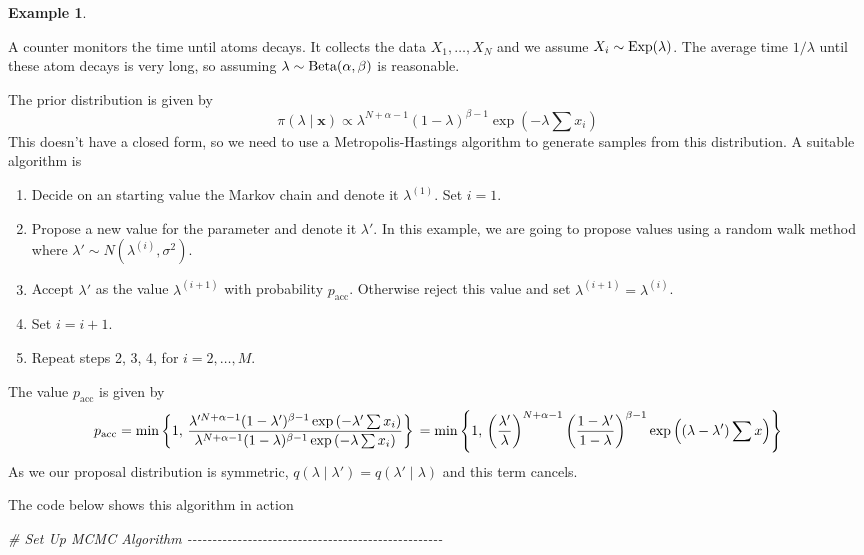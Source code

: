 \documentclass[
]{book}
\newenvironment{Shaded}{\begin{snugshade}}{\end{snugshade}}
\newcommand{\CommentTok}[1]{\textcolor[rgb]{0.56,0.35,0.01}{\textit{#1}}}
\providecommand{\tightlist}{%
  \setlength{\itemsep}{0pt}\setlength{\parskip}{0pt}}
\theoremstyle{definition}
\theoremstyle{definition}
\newtheorem{example}{Example}[chapter]
\theoremstyle{definition}
\theoremstyle{definition}
\theoremstyle{remark}
\begin{document}
\begin{example}
\protect\hypertarget{exm:norm}{}\label{exm:norm}

A counter monitors the time until atoms decays. It collects the data \(X_1, \ldots, X_N\) and we assume \(X_i \sim \hbox{Exp}(\lambda)\). The average time \(1/\lambda\) until these atom decays is very long, so assuming \(\lambda \sim \hbox{Beta}(\alpha, \beta)\) is reasonable.

The prior distribution is given by
\[
\pi(\lambda \mid \boldsymbol{x}) \propto \lambda^{N + \alpha - 1} (1 - \lambda)^{\beta - 1}\exp\left(-\lambda \sum x_i\right)
\]
This doesn't have a closed form, so we need to use a Metropolis-Hastings algorithm to generate samples from this distribution. A suitable algorithm is

\begin{enumerate}
\def\labelenumi{\arabic{enumi}.}
\tightlist
\item
  Decide on an starting value the Markov chain and denote it \(\lambda^{(1)}\). Set \(i = 1\).
\item
  Propose a new value for the parameter and denote it \(\lambda'\). In this example, we are going to propose values using a random walk method where \(\lambda' \sim N(\lambda^{(i)}, \sigma^2)\).
\item
  Accept \(\lambda'\) as the value \(\lambda^{(i+1)}\) with probability \(p_{\textrm{acc}}\). Otherwise reject this value and set \(\lambda^{(i+1)} = \lambda^{(i)}\).\\
\item
  Set \(i = i + 1\).
\item
  Repeat steps 2, 3, 4, for \(i = 2, \ldots, M\).
\end{enumerate}

The value \(p_{\textrm{acc}}\) is given by
\[
p_{\textrm{acc}} = \min \left\{1, \, \frac{\lambda'^{N + \alpha - 1} (1 - \lambda')^{\beta - 1}\exp\left(-\lambda' \sum x_i\right)}{\lambda^{N + \alpha - 1} (1 - \lambda)^{\beta - 1}\exp\left(-\lambda \sum x_i\right)}\right\} \\
= \min \left\{1, \, \left(\frac{\lambda'}{\lambda}\right)^{N + \alpha - 1} \left(\frac{1-\lambda'}{1-\lambda}\right)^{\beta -1} \exp\left((\lambda- \lambda')\sum x\right)\right\} 
\]
As we our proposal distribution is symmetric, \(q(\lambda \mid \lambda') = q(\lambda' \mid \lambda)\) and this term cancels.

The code below shows this algorithm in action

\begin{Shaded}
\begin{Highlighting}[]
\CommentTok{\# Set Up MCMC Algorithm {-}{-}{-}{-}{-}{-}{-}{-}{-}{-}{-}{-}{-}{-}{-}{-}{-}{-}{-}{-}{-}{-}{-}{-}{-}{-}{-}{-}{-}{-}{-}{-}{-}{-}{-}{-}{-}{-}{-}{-}{-}{-}{-}{-}{-}{-}{-}{-}{-}{-}{-}}


\end{Highlighting}
\end{Shaded}
\end{example}
\end{document}

